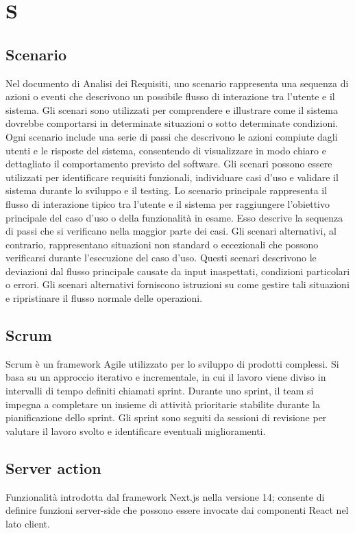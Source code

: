 \section*{S} 
\subsection*{Scenario} 
Nel documento di Analisi dei Requisiti, uno scenario rappresenta una sequenza di azioni o eventi che descrivono un possibile flusso di interazione tra l'utente e il sistema. Gli scenari sono utilizzati per comprendere e illustrare come il sistema dovrebbe comportarsi in determinate situazioni o sotto determinate condizioni. Ogni scenario include una serie di passi che descrivono le azioni compiute dagli utenti e le risposte del sistema, consentendo di visualizzare in modo chiaro e dettagliato il comportamento previsto del software. Gli scenari possono essere utilizzati per identificare requisiti funzionali, individuare casi d'uso e validare il sistema durante lo sviluppo e il testing. Lo scenario principale rappresenta il flusso di interazione tipico tra l'utente e il sistema per raggiungere l'obiettivo principale del caso d'uso o della funzionalità in esame. Esso descrive la sequenza di passi che si verificano nella maggior parte dei casi. Gli scenari alternativi, al contrario, rappresentano situazioni non standard o eccezionali che possono verificarsi durante l'esecuzione del caso d'uso. Questi scenari descrivono le deviazioni dal flusso principale causate da input inaspettati, condizioni particolari o errori. Gli scenari alternativi forniscono istruzioni su come gestire tali situazioni e ripristinare il flusso normale delle operazioni.
\subsection*{Scrum} 
Scrum è un framework Agile utilizzato per lo sviluppo di prodotti complessi. Si basa su un approccio iterativo e incrementale, in cui il lavoro viene diviso in intervalli di tempo definiti chiamati sprint. Durante uno sprint, il team si impegna a completare un insieme di attività prioritarie stabilite durante la pianificazione dello sprint. Gli sprint sono seguiti da sessioni di revisione per valutare il lavoro svolto e identificare eventuali miglioramenti. 
\subsection*{Server action} 
Funzionalità introdotta dal framework Next.js nella versione 14; consente di definire funzioni server-side che possono essere invocate dai componenti React nel lato client.
